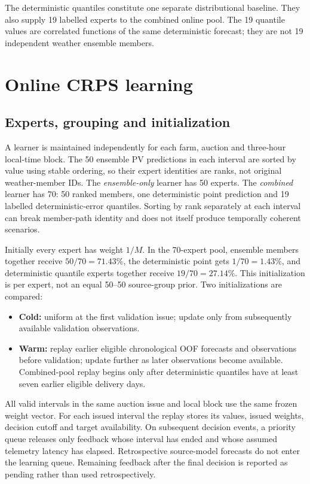\documentclass[11pt,a4paper]{article}
\begin{document}
The deterministic quantiles constitute one separate distributional baseline. They also supply 19 labelled experts to the combined online pool. The 19 quantile values are correlated functions of the same deterministic forecast; they are not 19 independent weather ensemble members.

\section{Online CRPS learning}\label{sec:online}
\subsection{Experts, grouping and initialization}
A learner is maintained independently for each farm, auction and three-hour local-time block. The 50 ensemble PV predictions in each interval are sorted by value using stable ordering, so their expert identities are ranks, not original weather-member IDs. The \emph{ensemble-only} learner has 50 experts. The \emph{combined} learner has 70: 50 ranked members, one deterministic point prediction and 19 labelled deterministic-error quantiles. Sorting by rank separately at each interval can break member-path identity and does not itself produce temporally coherent scenarios.

Initially every expert has weight $1/M$. In the 70-expert pool, ensemble members together receive $50/70=71.43\%$, the deterministic point gets $1/70=1.43\%$, and deterministic quantile experts together receive $19/70=27.14\%$. This initialization is per expert, not an equal 50--50 source-group prior. Two initializations are compared:
\begin{itemize}
\item \textbf{Cold:} uniform at the first validation issue; update only from subsequently available validation observations.
\item \textbf{Warm:} replay earlier eligible chronological OOF forecasts and observations before validation; update further as later observations become available. Combined-pool replay begins only after deterministic quantiles have at least seven earlier eligible delivery days.
\end{itemize}
All valid intervals in the same auction issue and local block use the same frozen weight vector. For each issued interval the replay stores its values, issued weights, decision cutoff and target availability. On subsequent decision events, a priority queue releases only feedback whose interval has ended and whose assumed telemetry latency has elapsed. Retrospective source-model forecasts do not enter the learning queue. Remaining feedback after the final decision is reported as pending rather than used retrospectively.
\end{document}
